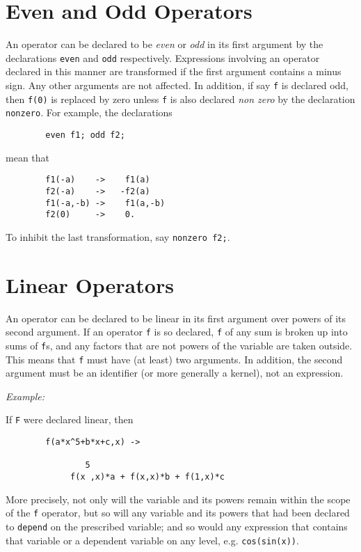 \section{Even and Odd Operators}
\hypertarget{command:EVEN}{}
\hypertarget{command:ODD}{}
\hypertarget{command:NONZERO}{}
An operator can be declared to be \emph{even} or \emph{odd} in its first
argument by the declarations \texttt{even} and
\texttt{odd} respectively.  Expressions involving an operator
declared in this manner are transformed if the first argument contains a
minus sign.  Any other arguments are not affected.  In addition, if say
\texttt{f} is declared odd, then \texttt{f(0)} is replaced by zero unless
\texttt{f} is also declared \emph{non zero} by the declaration
\texttt{nonzero}.
For example, the declarations
\begin{verbatim}
        even f1; odd f2;
\end{verbatim}
mean that
\begin{verbatim}
        f1(-a)    ->    f1(a)
        f2(-a)    ->   -f2(a)
        f1(-a,-b) ->    f1(a,-b)
        f2(0)     ->    0.
\end{verbatim}
To inhibit the last transformation, say \texttt{nonzero f2;}.

\section{Linear Operators}
\hypertarget{command:LINEAR}{}
An operator can be declared to be linear in its first argument over powers
of its second argument.  If an operator \texttt{f} is so declared, \texttt{f} of
any sum is broken up into sums of \texttt{f}s, and any factors that are not
powers of the variable are taken outside.  This means that \texttt{f} must
have (at least) two arguments.  In addition, the second argument must be
an identifier (or more generally a kernel), not an expression.

\textit{Example:}

If \texttt{F} were declared linear, then
\begin{verbatim}
        f(a*x^5+b*x+c,x) ->

                5
             f(x ,x)*a + f(x,x)*b + f(1,x)*c
\end{verbatim}
More precisely, not only will the variable and its powers remain within the
scope of the \texttt{f} operator, but so will any variable and its powers that
had been declared to \texttt{depend} on the prescribed variable; and so would
any expression that contains that variable or a dependent variable on any
level, e.g. \texttt{cos(sin(x))}.

